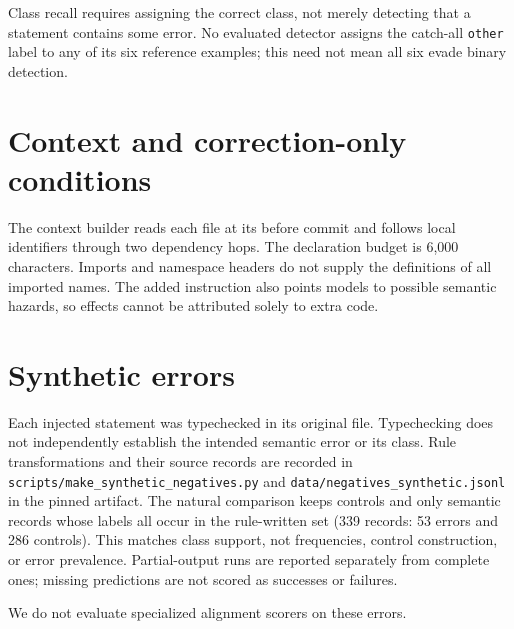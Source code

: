 \documentclass{article}
\begin{document}
Class recall requires assigning the correct class, not merely detecting that a statement contains some error.
No evaluated detector assigns the catch-all \texttt{other} label to any of
its six reference examples; this need not mean all six evade binary detection.

\section{Context and correction-only conditions}
\label{sec:context}

The context builder reads each file at its before commit and follows local
identifiers through two dependency hops. The declaration budget is 6,000
characters. Imports and namespace headers do not supply the definitions of
all imported names. The added instruction also points models to possible
semantic hazards, so effects cannot be attributed solely to extra code.

\begin{table}[h]\centering\small
{}
\caption{Keeping the corrected statement but removing review comments.
The correction-only condition retains other assisted metadata; $n$ gives
answered counts and $\dagger$ marks incomplete coverage. This intervention
is not a reviewer-comments-only condition.}
\end{table}
\clearpage
\section{Synthetic errors}
\label{sec:synthetic}
Each injected statement was typechecked in its original file. Typechecking
does not independently establish the intended semantic error or its class.
Rule transformations and their source records are recorded in
\texttt{scripts/make\_synthetic\_negatives.py} and
\texttt{data/negatives\_synthetic.jsonl} in the pinned artifact.
The natural comparison keeps controls and only semantic records whose labels
all occur in the rule-written set (339 records: 53 errors and 286 controls).
This matches class support, not frequencies, control construction, or error
prevalence. Partial-output runs are reported separately from complete ones;
missing predictions are not scored as successes or failures.

We do not evaluate specialized alignment scorers on these errors.
\end{document}

